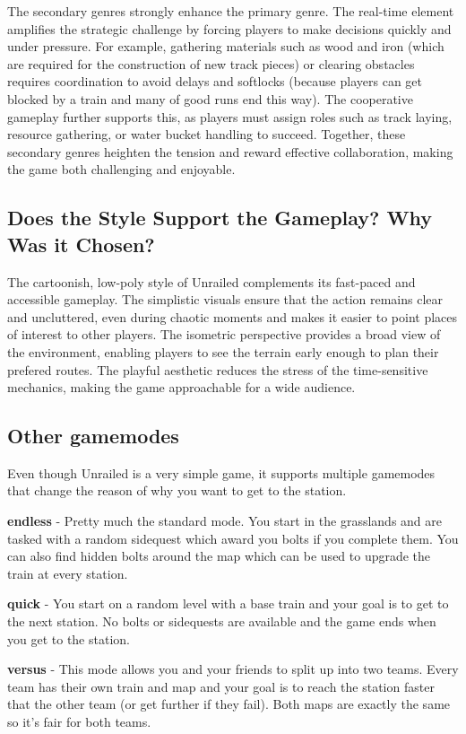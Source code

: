 \documentclass[a4paper,10pt,english]{article}
\begin{document}
The secondary genres strongly enhance the primary genre. The real-time element amplifies the strategic challenge by forcing players to make decisions quickly and under pressure. For example, gathering materials such as wood and iron (which are required for the construction of new track pieces) or clearing obstacles requires coordination to avoid delays and softlocks (because players can get blocked by a train and many of good runs end this way). The cooperative gameplay further supports this, as players must assign roles such as track laying, resource gathering, or water bucket handling to succeed. Together, these secondary genres heighten the tension and reward effective collaboration, making the game both challenging and enjoyable.

\subsection*{Does the Style Support the Gameplay? Why Was it Chosen?}

The cartoonish, low-poly style of Unrailed complements its fast-paced and accessible gameplay. The simplistic visuals ensure that the action remains clear and uncluttered, even during chaotic moments and makes it easier to point places of interest to other players. The isometric perspective provides a broad view of the environment, enabling players to see the terrain early enough to plan their prefered routes. The playful aesthetic reduces the stress of the time-sensitive mechanics, making the game approachable for a wide audience.

\subsection{Other gamemodes}
Even though Unrailed is a very simple game, it supports multiple gamemodes that change the reason of why you want to get to the station. 

\textbf{endless} -
Pretty much the standard mode. You start in the grasslands and are tasked with a random sidequest which award you bolts if you complete them. You can also find hidden bolts around the map which can be used to upgrade the train at every station. 

\textbf{quick} -
You start on a random level with a base train and your goal is to get to the next station. No bolts or sidequests are available and the game ends when you get to the station.

\textbf{versus} -
This mode allows you and your friends to split up into two teams. Every team has their own train and map and your goal is to reach the station faster that the other team (or get further if they fail).
Both maps are exactly the same so it's fair for both teams.
\end{document}
